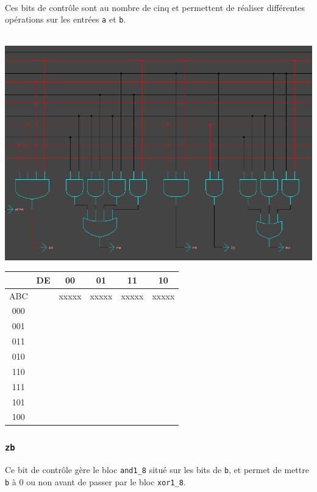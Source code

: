 \documentclass[11pt, a4paper, twoside, titlepage]{article}
\begin{document}
\paragraph{}
Ces bits de contrôle sont au nombre de cinq et permettent de réaliser différentes opérations sur les entrées \texttt{a} et \texttt{b}.\\
\\
\centerline{\includegraphics[width=.8 \textwidth]{log_alu}}
\begin{table}
	\centering
	\begin{tabular}{|c|c|c|c|c|c|}
		\hline
		& DE & 00 & 01 & 11 & 10 \\
		\hline
		ABC && xxxxx & xxxxx & xxxxx & xxxxx \\
		\hline 
		000 &&  &  &  &  \\
		\hline 
		001 &&  &  &  &  \\
		\hline 
		011 &&  &  &  &  \\
		\hline 
		010 &&  &  &  &  \\
		\hline 
		110 &&  &  &  &  \\
		\hline 
		111 &&  &  &  &  \\
		\hline 
		101 &&  &  &  &  \\
		\hline 
		100 &&  &  &  &  \\
		\hline
	\end{tabular} 
\end{table}

\subsubsection{\texttt{zb}}
Ce bit de contrôle gère le bloc \texttt{and1\_8} situé sur les bits de \texttt{b}, et permet de mettre \texttt{b} à 0 ou non avant de passer par le bloc \texttt{xor1\_8}.
\end{document}

